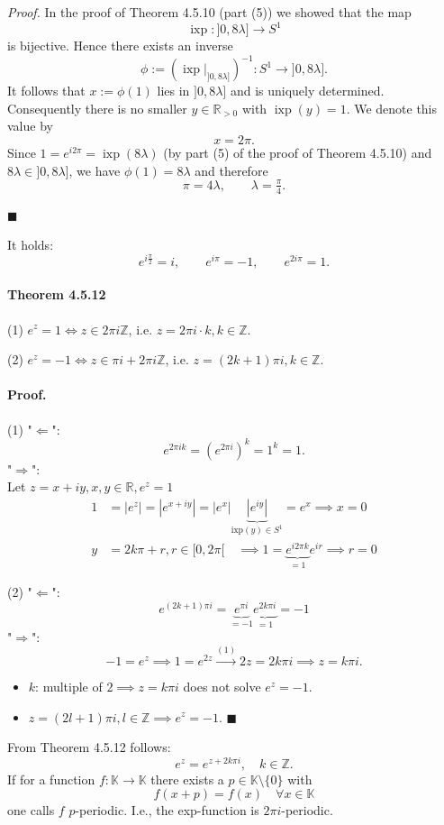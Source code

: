 \documentclass[12pt]{article}
\newcommand{\Z}{\mathbb{Z}}
\newcommand{\R}{\mathbb{R}}
\newcommand{\K}{\mathbb{K}} %
\begin{document}
	\emph{Proof.} In the proof of Theorem 4.5.10 (part (5)) we showed that the map
	\[
		\operatorname{ixp} : ]0,8\lambda] \to S^{1}
	\]
	is bijective. Hence there exists an inverse
	\[
		\phi := (\operatorname{ixp}|_{]0,8\lambda]})^{-1} : S^{1} \to ]0,8\lambda].
	\]
	It follows that $x := \phi(1)$ lies in $]0,8\lambda]$ and is uniquely determined. Consequently there is no smaller $y\in\mathbb R_{>0}$ with $\operatorname{ixp}(y)=1$. We denote this value by
	\[
		x = 2\pi.
	\]
	Since $1 = e^{i2\pi} = \operatorname{ixp}(8\lambda)$ (by part (5) of the proof of Theorem 4.5.10) and $8\lambda \in ]0,8\lambda]$, we have $\phi(1) = 8\lambda$ and therefore
	\[
		\pi = 4\lambda,\qquad \lambda = \tfrac{\pi}{4}.
	\]

		\hfill $\blacksquare$

		
	It holds:
\[
    e^{i \frac{\pi}{2}} = i, \qquad e^{i\pi} = -1, \qquad e^{2i\pi} = 1.
\]

\paragraph{Theorem 4.5.12}
(1) $e^z = 1 \iff z \in 2\pi i\Z$, i.e. $z = 2\pi i \cdot k, k \in \Z$.

(2) $e^z = -1 \iff z \in \pi i + 2\pi i\Z$, i.e. $z = (2k+1)\pi i, k \in \Z$.

\paragraph*{Proof.}

(1) "$\Longleftarrow$":
\[
    e^{2\pi i k} = (e^{2\pi i})^k = 1^k = 1.
\]
"$\Longrightarrow$":\\
Let $z = x + iy, x, y \in \R, e^z = 1$
\begin{align*}
    1 &= |e^z| = |e^{x+iy}| = |e^x| \underbrace{|e^{iy}|}_{\text{ixp}(y)\in S^1} = e^x \implies x = 0 \\
    y &= 2k\pi + r, r \in [0, 2\pi[ \quad \implies 1 = \underbrace{e^{i2\pi k}}_{=1} e^{ir} \implies r = 0
\end{align*}

(2) "$\Longleftarrow$":
\[
    e^{(2k+1)\pi i} = \underbrace{e^{\pi i}}_{=-1} \underbrace{e^{2k\pi i}}_{=1} = -1
\]
"$\Longrightarrow$":
\[
    -1 = e^z \implies 1 = e^{2z} \xrightarrow{(1)} 2z = 2k\pi i \implies z = k\pi i.
\]
\begin{itemize}
    \item[(a)] $k$: multiple of $2 \implies z = k\pi i$ does not solve $e^z = -1$.
    \item[(b)] $z = (2l + 1)\pi i, l \in \Z \implies e^z = -1$. \hfill $\blacksquare$
\end{itemize}
\bigskip
From Theorem 4.5.12 follows:
\[
    e^z = e^{z+2k\pi i}, \quad k \in \Z.
\]
If for a function $f : \K \to \K$ there exists a $p \in \K \setminus \{0\}$ with
\[
    f(x+p) = f(x) \quad \forall x \in \K
\]
one calls $f$ $p$-periodic. I.e., the exp-function is $2\pi i$-periodic.
\end{document}

